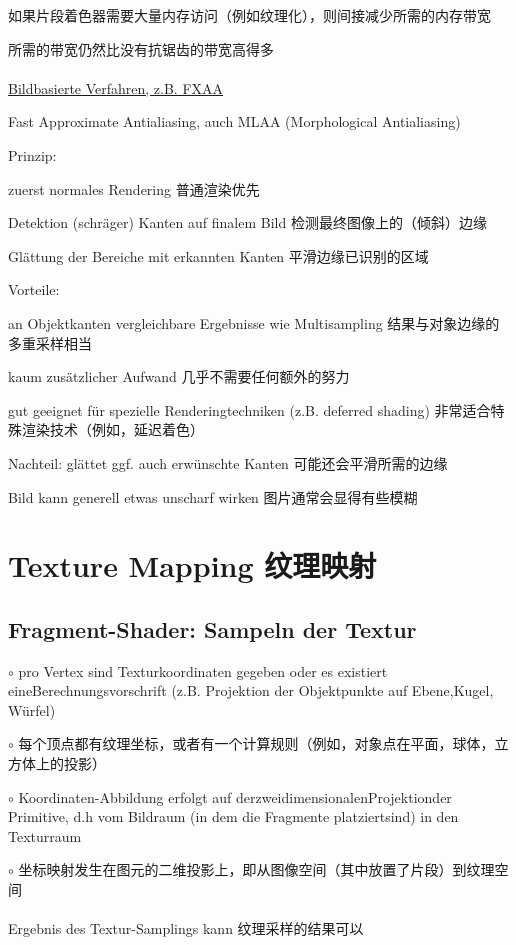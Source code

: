 \documentclass[fleqn]{article}
\begin{document}
如果片段着色器需要大量内存访问（例如纹理化），则间接减少所需的内存带宽

所需的带宽仍然比没有抗锯齿的带宽高得多
\\
\\
\underline{Bildbasierte Verfahren, z.B. FXAA}

\noindent Fast Approximate Antialiasing, auch MLAA (Morphological Antialiasing)

\noindent Prinzip:

zuerst normales Rendering 普通渲染优先

Detektion (schräger) Kanten auf finalem Bild 检测最终图像上的（倾斜）边缘

Glättung der Bereiche mit erkannten Kanten 平滑边缘已识别的区域

\noindent Vorteile:

an Objektkanten vergleichbare Ergebnisse wie Multisampling 结果与对象边缘的多重采样相当

kaum zusätzlicher Aufwand 几乎不需要任何额外的努力

gut geeignet für spezielle Renderingtechniken (z.B. deferred shading) 非常适合特殊渲染技术（例如，延迟着色）

\noindent Nachteil: glättet ggf. auch erwünschte Kanten 可能还会平滑所需的边缘

Bild kann generell etwas unscharf wirken 图片通常会显得有些模糊

\section{Texture Mapping 纹理映射}

\subsection{Fragment-Shader: Sampeln der Textur}

$\circ$ pro Vertex sind Texturkoordinaten gegeben oder es existiert eineBerechnungsvorschrift (z.B. Projektion der Objektpunkte auf Ebene,Kugel, Würfel)

$\circ$ 每个顶点都有纹理坐标，或者有一个计算规则（例如，对象点在平面，球体，立方体上的投影）

$\circ$ Koordinaten-Abbildung erfolgt auf derzweidimensionalenProjektionder Primitive, d.h vom Bildraum (in dem die Fragmente platziertsind) in den Texturraum

$\circ$ 坐标映射发生在图元的二维投影上，即从图像空间（其中放置了片段）到纹理空间
\\
\\
Ergebnis des Textur-Samplings kann 纹理采样的结果可以
\end{document}

